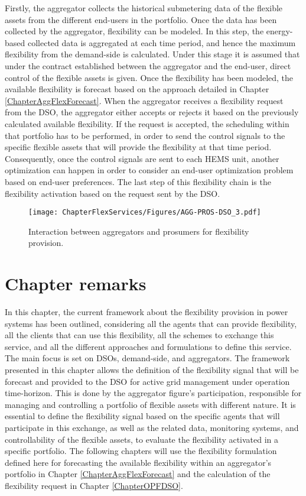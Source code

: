 Firstly, the aggregator collects the historical submetering data of the flexible assets from the different end-users in the portfolio. Once the data has been collected by the aggregator, flexibility can be modeled. In this step, the energy-based collected data is aggregated at each time period, and hence the maximum flexibility from the demand-side is calculated. Under this stage it is assumed that under the contract established between the aggregator and the end-user, direct control of the flexible assets is given. Once the flexibility has been modeled, the available flexibility is forecast based on the approach detailed in Chapter \ref{ChapterAggFlexForecast}. When the aggregator receives a flexibility request from the DSO, the aggregator either accepts or rejects it based on the previously calculated available flexibility. If the request is accepted, the scheduling within that portfolio has to be performed, in order to send the control signals to the specific flexible assets that will provide the flexibility at that time period. Consequently, once the control signals are sent to each HEMS unit, another optimization can happen in order to consider an end-user optimization problem based on end-user preferences. The last step of this flexibility chain is the flexibility activation based on the request sent by the DSO.

\begin{figure}[htbp]
	\centering
	\texttt{[image: ChapterFlexServices/Figures/AGG-PROS-DSO\_3.pdf]}
		\caption{Interaction between aggregators and prosumers for flexibility provision.}
	\label{fig:agg-pros-dso}  
\end{figure}

\newpage
\section{Chapter remarks}

In this chapter, the current framework about the flexibility provision in power systems has been outlined, considering all the agents that can provide flexibility, all the clients that can use this flexibility, all the schemes to exchange this service, and all the different approaches and formulations to define this service. The main focus is set on DSOs, demand-side, and aggregators. The framework presented in this chapter allows the definition of the flexibility signal that will be forecast and provided to the DSO for active grid management under operation time-horizon. This is done by the aggregator figure's participation, responsible for managing and controlling a portfolio of flexible assets with different nature. It is essential to define the flexibility signal based on the specific agents that will participate in this exchange, as well as the related data, monitoring systems, and controllability of the flexible assets, to evaluate the flexibility activated in a specific portfolio. The following chapters will use the flexibility formulation defined here for forecasting the available flexibility within an aggregator's portfolio in Chapter \ref{ChapterAggFlexForecast} and the calculation of the flexibility request in Chapter \ref{ChapterOPFDSO}. 



